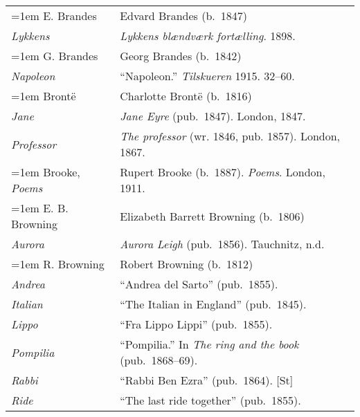 \begin{xltabular}{\textwidth}{ lQ }
\hangindent=1em  E. Brandes & Edvard Brandes (b.~1847)\\
\hspace{1em}\textit{Lykkens} & \textit{Lykkens blændværk fortælling}. 1898. \\

\hangindent=1em  G. Brandes & Georg Brandes (b.~1842)\\
\hspace{1em}\textit{Napoleon} & ``Napoleon.'' \textit{Tilskueren} 1915. 32--60. \\ %

\pagebreak
\hangindent=1em  Brontë & Charlotte Brontë (b.~1816) \\
\hspace{1em}\textit{Jane} & \textit{Jane Eyre} (pub.~1847). London, 1847. \\
\hspace{1em}\textit{Professor} & \textit{The professor} (wr. 1846, pub. 1857). London, 1867. \\

\hangindent=1em  Brooke, \textit{Poems} & Rupert Brooke (b.~1887). \textit{Poems}. London, 1911. \\ 

\hangindent=1em  E. B. Browning & Elizabeth Barrett Browning (b.~1806)\\
\hspace{1em}\textit{Aurora} & \textit{Aurora Leigh} (pub.~1856). Tauchnitz, n.d. \\ %

\hangindent=1em  R. Browning & Robert Browning (b.~1812) \\
\hspace{1em}\textit{Andrea} & ``Andrea del Sarto'' (pub.~1855). \\ 
\hspace{1em}\textit{Italian} & ``The Italian in England'' (pub.~1845). \\ 
\hspace{1em}\textit{Lippo} & ``Fra Lippo Lippi'' (pub.~1855). \\ 
\hspace{1em}\textit{Pompilia} & ``Pompilia.'' In \textit{The ring and the book} (pub.~1868--69). \\ 
\hspace{1em}\textit{Rabbi} & ``Rabbi Ben Ezra'' (pub.~1864). [St] \\
\hspace{1em}\textit{Ride} & ``The last ride together'' (pub.~1855). \\


\end{xltabular}
